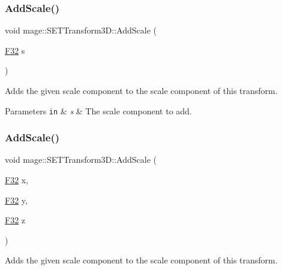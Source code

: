 \subsubsection{\texorpdfstring{Add\+Scale()}{AddScale()}\hspace{0.1cm}{\footnotesize\ttfamily [1/4]}}
{\footnotesize\ttfamily void mage\+::\+S\+E\+T\+Transform3\+D\+::\+Add\+Scale (\begin{DoxyParamCaption}\item[{\mbox{\hyperlink{namespacemage_aa97e833b45f06d60a0a9c4fc22ae02c0}{F32}}}]{s }\end{DoxyParamCaption})\hspace{0.3cm}{\ttfamily [noexcept]}}

Adds the given scale component to the scale component of this transform.


\begin{DoxyParams}[1]{Parameters}
\mbox{\tt in}  & {\em s} & The scale component to add. \\
\hline
\end{DoxyParams}
\mbox{\label{classmage_1_1_s_e_t_transform3_d_a62829e4d91334749c9f4ddca244379b4}} 
\subsubsection{\texorpdfstring{Add\+Scale()}{AddScale()}\hspace{0.1cm}{\footnotesize\ttfamily [2/4]}}
{\footnotesize\ttfamily void mage\+::\+S\+E\+T\+Transform3\+D\+::\+Add\+Scale (\begin{DoxyParamCaption}\item[{\mbox{\hyperlink{namespacemage_aa97e833b45f06d60a0a9c4fc22ae02c0}{F32}}}]{x,  }\item[{\mbox{\hyperlink{namespacemage_aa97e833b45f06d60a0a9c4fc22ae02c0}{F32}}}]{y,  }\item[{\mbox{\hyperlink{namespacemage_aa97e833b45f06d60a0a9c4fc22ae02c0}{F32}}}]{z }\end{DoxyParamCaption})\hspace{0.3cm}{\ttfamily [noexcept]}}

Adds the given scale component to the scale component of this transform.


